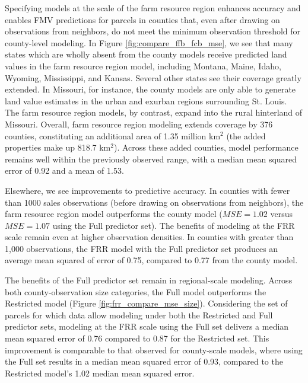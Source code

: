 \documentclass[12pt]{article}
\begin{document}
Specifying models at the scale of the farm resource region enhances accuracy and enables FMV predictions for parcels in counties that, even after drawing on observations from neighbors, do not meet the minimum observation threshold for county-level modeling. In Figure \ref{fig:compare_ffb_fcb_mse}, we see that many states which are wholly absent from the county models receive predicted land values in the farm resource region model, including Montana, Maine, Idaho, Wyoming, Mississippi, and Kansas. Several other states see their coverage greatly extended. In Missouri, for instance, the county models are only able to generate land value estimates in the urban and exurban regions surrounding St. Louis. The farm resource region models, by contrast, expand into the rural hinterland of Missouri. Overall, farm resource region modeling extends coverage by 376 counties, constituting an additional area of 1.35 million km$^2$ (the added properties make up 818.7 km$^2$). Across these added counties, model performance remains well within the previously observed range, with a median mean squared error of 0.92 and a mean of 1.53. 

Elsewhere, we see improvements to predictive accuracy. In counties with fewer than 1000 sales observations (before drawing on observations from neighbors), the farm resource region model outperforms the county model ($MSE=1.02$ versus $MSE=1.07$ using the Full predictor set). The benefits of modeling at the FRR scale remain even at higher observation densities. In counties with greater than 1,000 observations, the FRR model with the Full predictor set produces an average mean squared of error of 0.75, compared to 0.77 from the county model. 

The benefits of the Full predictor set remain in regional-scale modeling. Across both county-observation size categories, the Full model outperforms the Restricted model (Figure \ref{fig:frr_compare_mse_size}). Considering the set of parcels for which data allow modeling under both the Restricted and Full predictor sets, modeling at the FRR scale using the Full set delivers a median mean squared error of 0.76 compared to 0.87 for the Restricted set. This improvement is comparable to that observed for county-scale models, where using the Full set results in a median mean squared error of 0.93, compared to the Restricted model's 1.02 median mean squared error.
\end{document}
